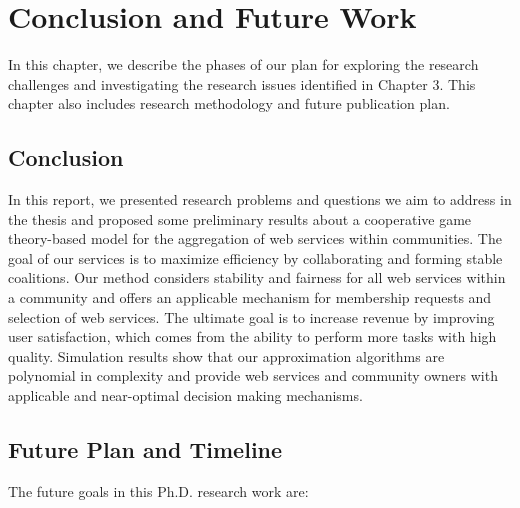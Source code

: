\setcounter{chapter}{3}
\chapter{Conclusion and Future Work}\label{sec:conclusionfuturework}
In this chapter, we describe the phases of our plan for exploring
the research challenges and investigating the research issues
identified in Chapter 3. This chapter also includes research
methodology and future publication plan.

\section {Conclusion}

In this report, we presented research problems and questions we
aim to address in the thesis and proposed some preliminary results
about a cooperative game theory-based model for the aggregation of
web services within communities. The goal of our services is to
maximize efficiency by collaborating and forming stable
coalitions. Our method considers stability and fairness for all
web services within a community and offers an applicable mechanism
for membership requests and selection of web services. The
ultimate goal is to increase revenue by improving user
satisfaction, which comes from the ability to perform more tasks
with high quality. Simulation results show that our approximation
algorithms are polynomial in complexity and provide web services
and community owners with applicable and near-optimal decision
making mechanisms.


\section {Future Plan and Timeline}

\indent The future goals in this Ph.D. research work are:

